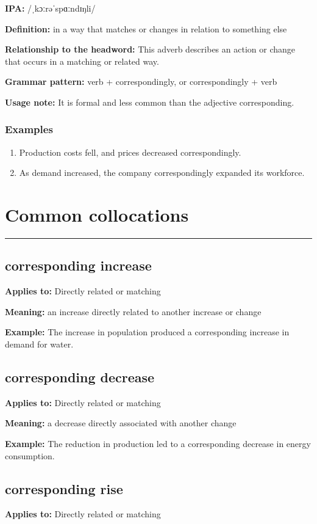 \documentclass[11pt]{article}
\newcommand{\sectionrule}{\par\vspace{-0.5em}\noindent\textcolor{Accent}{\rule{\linewidth}{0.6pt}}\par}
\begin{document}
\textbf{IPA:} /ˌkɔːrəˈspɑːndɪŋli/

\textbf{Definition:} in a way that matches or changes in relation to something else

\textbf{Relationship to the headword:} This adverb describes an action or change that occurs in a matching or related way.

\textbf{Grammar pattern:} verb + correspondingly, or correspondingly + verb

\textbf{Usage note:} It is formal and less common than the adjective corresponding.

\subsubsection{Examples}
\begin{enumerate}
  \item Production costs fell, and prices decreased correspondingly.
  \item As demand increased, the company correspondingly expanded its workforce.
\end{enumerate}

\section{Common collocations}
\sectionrule
\subsection{corresponding increase}
\textbf{Applies to:} Directly related or matching

\textbf{Meaning:} an increase directly related to another increase or change

\textbf{Example:} The increase in population produced a corresponding increase in demand for water.

\subsection{corresponding decrease}
\textbf{Applies to:} Directly related or matching

\textbf{Meaning:} a decrease directly associated with another change

\textbf{Example:} The reduction in production led to a corresponding decrease in energy consumption.

\subsection{corresponding rise}
\textbf{Applies to:} Directly related or matching
\end{document}
